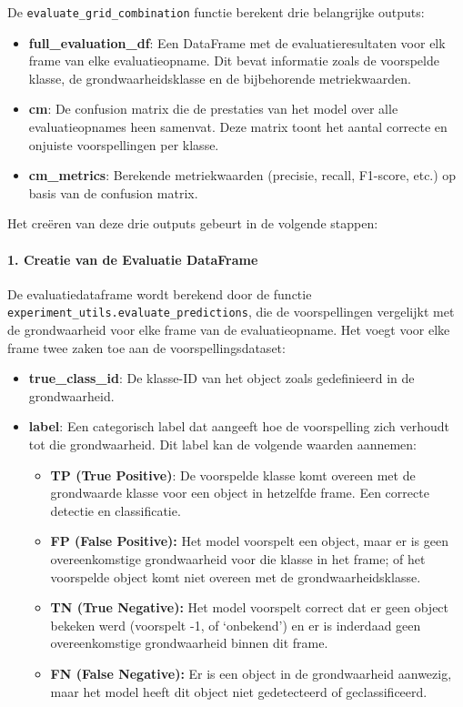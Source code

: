 De \texttt{evaluate\_grid\_combination} functie berekent drie belangrijke outputs:
\begin{itemize}
    \item \textbf{full\_evaluation\_df}: Een DataFrame met de evaluatieresultaten voor elk frame van elke evaluatieopname.
    Dit bevat informatie zoals de voorspelde klasse, de grondwaarheidsklasse en de bijbehorende metriekwaarden.
    \item \textbf{cm}: De confusion matrix die de prestaties van het model over alle evaluatieopnames heen samenvat.
    Deze matrix toont het aantal correcte en onjuiste voorspellingen per klasse.
    \item \textbf{cm\_metrics}: Berekende metriekwaarden (precisie, recall, F1-score, etc.) op basis van de confusion matrix.
\end{itemize}

Het creëren van deze drie outputs gebeurt in de volgende stappen:

\paragraph{1. Creatie van de Evaluatie DataFrame}
De evaluatiedataframe wordt berekend door de functie \texttt{experiment\_utils.evaluate\_predictions},
die de voorspellingen vergelijkt met de grondwaarheid voor elke frame van de evaluatieopname.
Het voegt voor elke frame twee zaken toe aan de voorspellingsdataset:
\begin{itemize}
    \item \textbf{true\_class\_id}: De klasse-ID van het object zoals gedefinieerd in de grondwaarheid.
    \item \textbf{label}: Een categorisch label dat aangeeft hoe de voorspelling zich verhoudt tot die grondwaarheid. Dit label kan de volgende waarden aannemen:
        \begin{itemize}
            \item \textbf{TP (True Positive)}: De voorspelde klasse komt overeen met de grondwaarde klasse voor een object in hetzelfde frame. 
            Een correcte detectie en classificatie.
            \item \textbf{FP (False Positive):} Het model voorspelt een object, maar er is geen overeenkomstige grondwaarheid 
            voor die klasse in het frame; of het voorspelde object komt niet overeen met de grondwaarheidsklasse.
            \item \textbf{TN (True Negative):} Het model voorspelt correct dat er geen object bekeken werd (voorspelt -1, of `onbekend') 
            en er is inderdaad geen overeenkomstige grondwaarheid binnen dit frame.
            \item \textbf{FN (False Negative):} Er is een object in de grondwaarheid aanwezig, maar het model heeft dit object niet gedetecteerd of geclassificeerd.
        \end{itemize} 
\end{itemize}

